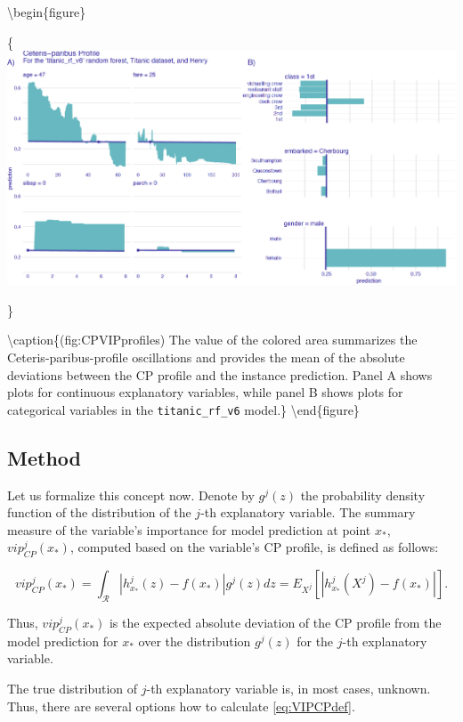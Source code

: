 \documentclass[12pt,]{krantz}
\theoremstyle{definition}
\theoremstyle{definition}
\theoremstyle{definition}
\theoremstyle{remark}
\begin{document}
\textbackslash{}begin\{figure\}

\{\centering \includegraphics[width=0.99\linewidth]{figure/profile_v4_rf2}

\}

\textbackslash{}caption\{(fig:CPVIPprofiles) The value of the colored
area summarizes the Ceteris-paribus-profile oscillations and provides
the mean of the absolute deviations between the CP profile and the
instance prediction. Panel A shows plots for continuous explanatory
variables, while panel B shows plots for categorical variables in the
\texttt{titanic\_rf\_v6} model.\}\label{fig:CPVIPprofiles}
\textbackslash{}end\{figure\}

\hypertarget{CPOscMethod}{%
\subsection{Method}\label{CPOscMethod}}

Let us formalize this concept now. Denote by \(g^j(z)\) the probability
density function of the distribution of the \(j\)-th explanatory
variable. The summary measure of the variable's importance for model
prediction at point \(x_*\), \(vip_{CP}^{j}(x_*)\), computed based on
the variable's CP profile, is defined as follows:

\begin{equation}
vip_{CP}^j(x_*) = \int_{\mathcal R} |h^{j}_{x_*}(z) - f(x_*)| g^j(z)dz=E_{X^j}\left[|h^{j}_{x_*}(X^j) - f(x_*)|\right].
\label{eq:VIPCPdef}
\end{equation}

Thus, \(vip_{CP}^j(x_*)\) is the expected absolute deviation of the CP
profile from the model prediction for \(x_*\) over the distribution
\(g^j(z)\) for the \(j\)-th explanatory variable.

The true distribution of \(j\)-th explanatory variable is, in most
cases, unknown. Thus, there are several options how to calculate
\eqref{eq:VIPCPdef}.
\end{document}
